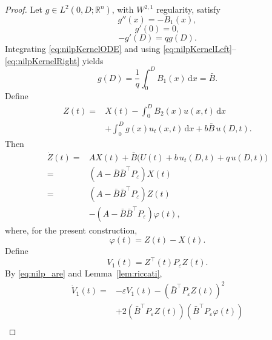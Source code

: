 \documentclass{IEEEtran}
\theoremstyle{definition}
\begin{document}
\begin{proof}
Let $g\in L^2(0,D;\mathbb R^n)$, with $W^{2,1}$ regularity, satisfy
\begin{equation}
 g''(x)=-B_1(x),
\label{eq:nilpKernelODE}
\end{equation}
\begin{equation}
 g'(0)=0,
\label{eq:nilpKernelLeft}
\end{equation}
\begin{equation}
 -g'(D)=qg(D).
\label{eq:nilpKernelRight}
\end{equation}
Integrating \eqref{eq:nilpKernelODE} and using
\eqref{eq:nilpKernelLeft}--\eqref{eq:nilpKernelRight} yields
\begin{equation}
 g(D)=\frac1q\int_0^D B_1(x)\,\mathrm dx=\bar B.
\label{eq:nilpKernelEndpoint}
\end{equation}
Define
\begin{equation}
\begin{aligned}
 Z(t)={}&X(t)-\int_0^D B_2(x)u(x,t)\,\mathrm dx\\
 &+\int_0^D g(x)u_t(x,t)\,\mathrm dx+b\bar B\,u(D,t).
\end{aligned}
\label{eq:nilpZ}
\end{equation}
Then
\begin{equation}
\begin{aligned}
\dot Z(t)={}&AX(t)+\bar B\bigl(U(t)+b\,u_t(D,t)+q\,u(D,t)\bigr)\\
={}&(A-\bar B\bar B^\top P_\varepsilon)X(t)\\
={}&(A-\bar B\bar B^\top P_\varepsilon)Z(t)\\
 &-(A-\bar B\bar B^\top P_\varepsilon)\varphi(t),
\end{aligned}
\label{eq:nilpZdot}
\end{equation}
where, for the present construction,
\begin{equation}
 \varphi(t)=Z(t)-X(t).
\label{eq:nilpPhi}
\end{equation}
Define
\begin{equation}
 V_1(t)=Z^\top(t)P_\varepsilon Z(t).
\label{eq:nilpV1}
\end{equation}
By \eqref{eq:nilp_are} and Lemma~\ref{lem:riccati},
\begin{equation}
\begin{aligned}
\dot V_1(t)={}&-\varepsilon V_1(t)
 -(\bar B^\top P_\varepsilon Z(t))^2\\
 &+2(\bar B^\top P_\varepsilon Z(t))
 (\bar B^\top P_\varepsilon\varphi(t))\\

\end{aligned}
\end{equation}
\end{proof}
\end{document}
